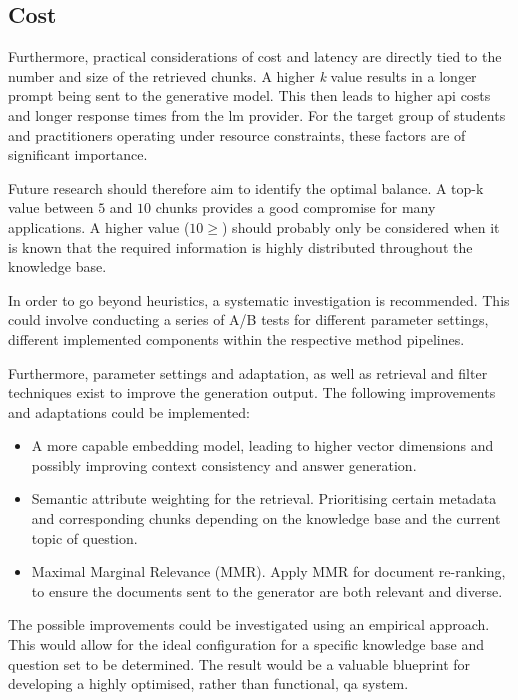 \subsection{Cost}
Furthermore, practical considerations of cost and latency are directly tied to the number and size of the retrieved chunks. 
A higher \textit{k} value results in a longer prompt being sent to the generative model.
This then leads to higher \ac{api} costs and longer response times from the \ac{lm} provider.
For the target group of students and practitioners operating under resource constraints, these factors are of significant importance.

Future research should therefore aim to identify the optimal balance.
A top-k value between $5$ and $10$ chunks provides a good compromise for many applications. 
A higher value ($10\geq$) should probably only be considered when it is known that the required information is highly distributed throughout the knowledge base.
%

In order to go beyond heuristics, a systematic investigation is recommended. 
This could involve conducting a series of A/B tests for different parameter settings, different implemented components within the respective method pipelines.

Furthermore, parameter settings and adaptation, as well as retrieval and filter techniques exist to improve the generation output.
The following improvements and adaptations could be implemented:
\begin{itemize}
    \item A more capable embedding model, leading to higher vector dimensions and possibly improving context consistency and answer generation. 
    \item Semantic attribute weighting for the retrieval.
    Prioritising certain metadata and corresponding chunks depending on the knowledge base and the current topic of question.
    \item Maximal Marginal Relevance (MMR). Apply MMR for document re-ranking, to ensure the documents sent to the generator are both relevant and diverse.
\end{itemize}
The possible improvements could be investigated using an empirical approach.
This would allow for the ideal configuration for a specific knowledge base and question set to be determined.
The result would be a valuable blueprint for developing a highly optimised, rather than functional, \ac{qa} system.


